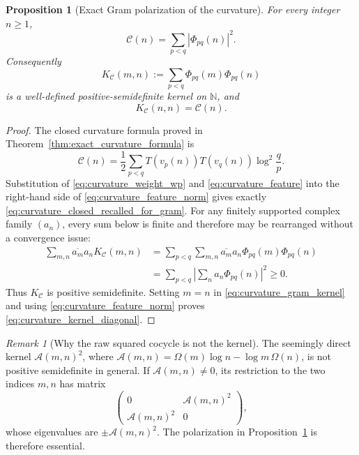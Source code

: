 \documentclass[11pt]{amsart}
\numberwithin{equation}{section}
\theoremstyle{plain}
\newtheorem{proposition}[theorem]{Proposition}
\theoremstyle{definition}
\theoremstyle{remark}
\newtheorem{remark}[theorem]{Remark}
\begin{document}
\begin{proposition}[Exact Gram polarization of the curvature]
\label{prop:curvature_gram_polarization}
For every integer \(n\ge1\),
\begin{equation}
\boxed{
\mathcal C(n)=\sum_{p<q}|\Phi_{pq}(n)|^2.}
\label{eq:curvature_feature_norm}
\end{equation}
Consequently
\begin{equation}
K_{\mathcal C}(m,n)
:=\sum_{p<q}\Phi_{pq}(m)\Phi_{pq}(n)
\label{eq:curvature_gram_kernel}
\end{equation}
is a well-defined positive-semidefinite kernel on \(\mathbb N\), and
\begin{equation}
K_{\mathcal C}(n,n)=\mathcal C(n).
\label{eq:curvature_kernel_diagonal}
\end{equation}
\end{proposition}

\begin{proof}
The closed curvature formula proved in
Theorem~\ref{thm:exact_curvature_formula} is
\begin{equation}
\mathcal C(n)
=\frac12\sum_{p<q}
T(v_p(n))T(v_q(n))\log^2\frac{q}{p}.
\label{eq:curvature_closed_recalled_for_gram}
\end{equation}
Substitution of \eqref{eq:curvature_weight_wp} and
\eqref{eq:curvature_feature} into the right-hand side of
\eqref{eq:curvature_feature_norm} gives exactly
\eqref{eq:curvature_closed_recalled_for_gram}.  For any finitely supported
complex family \((a_n)\), every sum below is finite and therefore may be
rearranged without a convergence issue:
\begin{align}
\sum_{m,n}\overline{a_m}a_nK_{\mathcal C}(m,n)
&=\sum_{p<q}\sum_{m,n}
\overline{a_m}a_n\Phi_{pq}(m)\Phi_{pq}(n)
\label{eq:curvature_kernel_quadratic_expand}\\
&=\sum_{p<q}\left|\sum_n a_n\Phi_{pq}(n)\right|^2
\ge0.
\label{eq:curvature_kernel_quadratic_positive}
\end{align}
Thus \(K_{\mathcal C}\) is positive semidefinite.  Setting \(m=n\) in
\eqref{eq:curvature_gram_kernel} and using
\eqref{eq:curvature_feature_norm} proves
\eqref{eq:curvature_kernel_diagonal}.
\end{proof}

\begin{remark}[Why the raw squared cocycle is not the kernel]
\label{rem:raw_cocycle_square_indefinite}
The seemingly direct kernel
\(\mathscr A(m,n)^2\), where
\(\mathscr A(m,n)=\Omega(m)\log n-\log m\,\Omega(n)\), is not positive
semidefinite in general.  If \(\mathscr A(m,n)\ne0\), its restriction to the
two indices \(m,n\) has matrix
\begin{equation}
\begin{pmatrix}
0&\mathscr A(m,n)^2\\
\mathscr A(m,n)^2&0
\end{pmatrix},
\label{eq:raw_cocycle_square_matrix}
\end{equation}
whose eigenvalues are
\(\pm\mathscr A(m,n)^2\).  The polarization in
Proposition~\ref{prop:curvature_gram_polarization} is therefore essential.
\end{remark}
\end{document}
